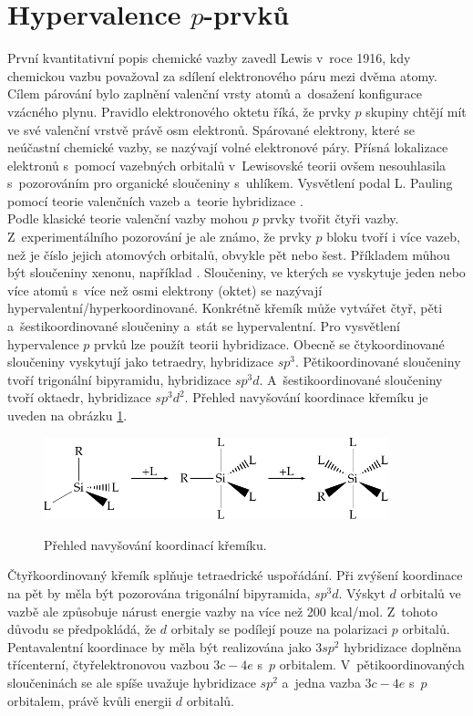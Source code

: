 \documentclass[
digital, %
table,   %
nolof,     %
nolot,     %
oneside,
]{fithesis3}
\begin{document}
\section{Hypervalence $p$-prvků}
První kvantitativní popis chemické vazby zavedl Lewis v~roce 1916, kdy chemickou vazbu považoval za sdílení elektronového páru mezi dvěma atomy. Cílem párování bylo zaplnění valenční vrsty atomů a~dosažení konfigurace vzácného plynu. Pravidlo elektronového oktetu říká, že  prvky $p$ skupiny chtějí mít ve své valenční vrstvě právě osm elektronů. Spárované elektrony, které se neúčastní chemické vazby, se nazývají volné elektronové páry. Přísná lokalizace elektronů s~pomocí vazebných orbitalů v~Lewisovské teorii ovšem nesouhlasila s~pozorováním pro organické sloučeniny s~uhlíkem. Vysvětlení podal L. Pauling pomocí teorie valenčních vazeb a~teorie hybridizace \cite{Munzarova1996thesis}.\\

Podle klasické teorie valenční vazby mohou $p$ prvky tvořit čtyři vazby. Z~experimentálního pozorování je ale známo, že prvky $p$ bloku tvoří i více vazeb, než je číslo jejich atomových orbitalů, obvykle pět nebo šest. Příkladem můhou být sloučeniny xenonu, například .
Sloučeniny, ve kterých se vyskytuje jeden nebo více atomů s~více než osmi elektrony (oktet) se nazývají hypervalentní/hyperkoordinované. Konkrétně křemík může vytvářet čtyř, pěti a~šestikoordinované sloučeniny a~stát se hypervalentní. Pro vysvětlení hypervalence $p$ prvků lze použít teorii hybridizace. Obecně se čtykoordinované sloučeniny vyskytují jako tetraedry, hybridizace $sp^3$. Pětikoordinované sloučeniny tvoří trigonální bipyramidu, hybridizace $sp^3d$. A~šestikoordinované sloučeniny tvoří oktaedr, hybridizace $sp^3d^2$. Přehled navyšování koordinace křemíku je uveden na obrázku \ref{prehled_koordinaci}.

\begin{figure}
\caption{Přehled navyšování koordinací křemíku.}
\center \includegraphics[width=10cm]{drawing.pdf} \label{prehled_koordinaci} \end{figure}

Čtyřkoordinovaný křemík splňuje tetraedrické uspořádání. Při zvýšení koordinace na pět by měla být pozorována trigonální bipyramida, $sp^3d$. Výskyt $d$ orbitalů ve vazbě ale způsobuje nárust energie vazby na více než 200 kcal/mol. Z~tohoto důvodu se předpokládá, že $d$ orbitaly se podílejí pouze na polarizaci $p$ orbitalů. Pentavalentní koordinace by měla být realizována jako $3sp^2$ hybridizace doplněna třícenterní, čtyřelektronovou vazbou $3c-4e$ s~$p$ orbitalem. V~pětikoordinovaných sloučeninách se ale spíše uvažuje hybridizace $sp^2$ a~jedna vazba $3c-4e$ s~$p$ orbitalem, právě kvůli energii $d$ orbitalů.
\end{document}
